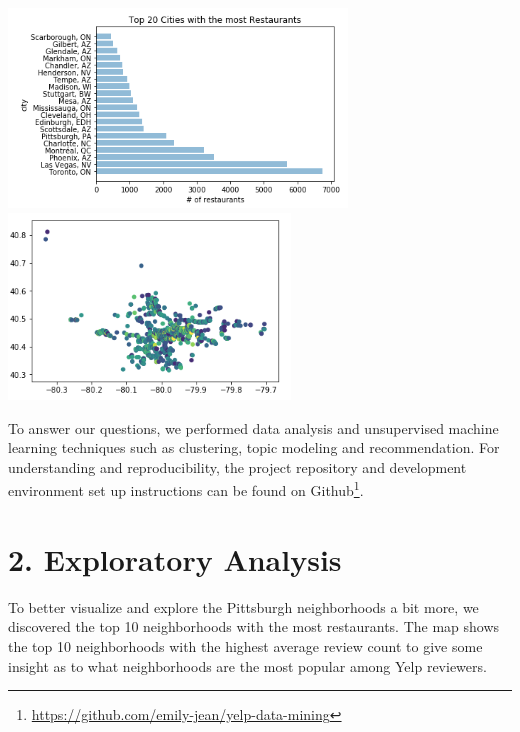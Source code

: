 \documentclass{neu_handout}
\begin{document}
\begin{center}
\includegraphics[width=90mm,scale=0.5]{cities}
\includegraphics[width=75mm,scale=0.5]{pa_popular_restaurants}
\end{center}

To answer our questions, we performed data analysis and unsupervised machine learning techniques such as clustering, topic modeling and recommendation. For understanding and reproducibility, the project repository and development environment set up instructions can be found on Github\footnote{\url{https://github.com/emily-jean/yelp-data-mining}}. 

\section*{2. Exploratory Analysis}


To better visualize and explore the Pittsburgh neighborhoods a bit more, we discovered the top 10 neighborhoods with the most restaurants. The map shows the top 10 neighborhoods with the highest average review count to give some insight as to what neighborhoods are the most popular among Yelp reviewers.
\end{document}
